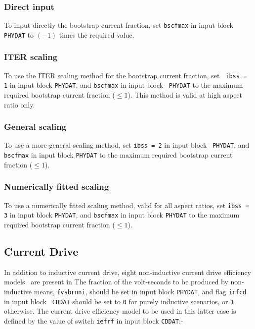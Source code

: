 \subsubsection{Direct input}
To input directly the bootstrap current fraction, set {\tt bscfmax} in input
block {\tt PHYDAT} to $(-1)$ times the required value.

\subsubsection{ITER scaling \protect\cite{IPDG}}

To use the ITER scaling method for the bootstrap current fraction, set {\tt
ibss = 1} in input block {\tt PHYDAT}, and {\tt bscfmax} in input block {\tt
PHYDAT} to the maximum required bootstrap current fraction ($\leq 1$). This
method is valid at high aspect ratio only.

\subsubsection{General scaling \protect\cite{Nevins}}

To use a more general scaling method, set {\tt ibss = 2} in input block {\tt
PHYDAT}, and {\tt bscfmax} in input block {\tt PHYDAT} to the maximum required
bootstrap current fraction ($\leq 1$).

\subsubsection{Numerically fitted scaling \protect\cite{172}}

To use a numerically fitted scaling method, valid for all aspect ratios, set
{\tt ibss = 3} in input block {\tt PHYDAT}, and {\tt bscfmax} in input block
{\tt PHYDAT} to the maximum required bootstrap current fraction ($\leq 1$).

\subsection{Current Drive}

In addition to inductive current drive, eight non-inductive current drive
efficiency models~\cite{172} are present in \PSD The fraction of the
volt-seconds to be produced by non-inductive means, {\tt fvsbrnni}, should be
set in input block {\tt PHYDAT}, and flag {\tt irfcd} in input block {\tt
CDDAT} should be set to {\tt 0} for purely inductive scenarios, or {\tt 1}
otherwise. The current drive efficiency model to be used in this latter case
is defined by the value of switch {\tt iefrf} in input block {\tt CDDAT}:-


